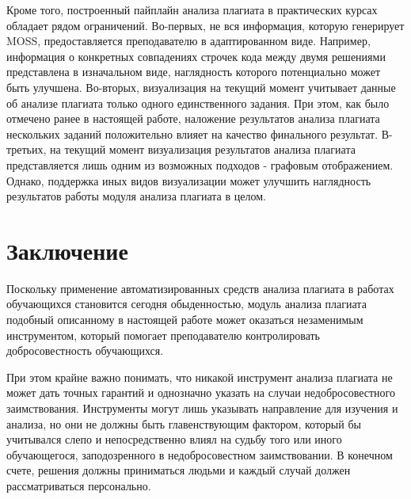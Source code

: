 \documentclass[a4paper,14pt]{extarticle}
\begin{document}
Кроме того, построенный пайплайн анализа плагиата в практических курсах обладает рядом ограничений. Во-первых, не вся информация, которую генерирует MOSS, предоставляется преподавателю в адаптированном виде. Например, информация о конкретных совпадениях строчек кода между двумя решениями представлена в изначальном виде, наглядность которого потенциально может быть улучшена. Во-вторых, визуализация на текущий момент учитывает данные об анализе плагиата только одного единственного задания. При этом, как было отмечено ранее в настоящей работе, наложение результатов анализа плагиата нескольких заданий положительно влияет на качество финального результат. В-третьих, на текущий момент визуализация результатов анализа плагиата представляется лишь одним из возможных подходов - графовым отображением. Однако, поддержка иных видов визуализации может улучшить наглядность результатов работы модуля анализа плагиата в целом.

\section{Заключение}

Поскольку применение автоматизированных средств анализа плагиата в работах обучающихся становится сегодня обыденностью, модуль анализа плагиата подобный описанному в настоящей работе может оказаться незаменимым инструментом, который помогает преподавателю контролировать добросовестность обучающихся.

При этом крайне важно понимать, что никакой инструмент анализа плагиата не может дать точных гарантий и однозначно указать на случаи недобросовестного заимствования. Инструменты могут лишь указывать направление для изучения и анализа, но они не должны быть главенствующим фактором, который бы учитывался слепо и непосредственно влиял на судьбу того или иного обучающегося, заподозренного в недобросовестном заимствовании. В конечном счете, решения должны приниматься людьми и каждый случай должен рассматриваться персонально.



\end{document}
